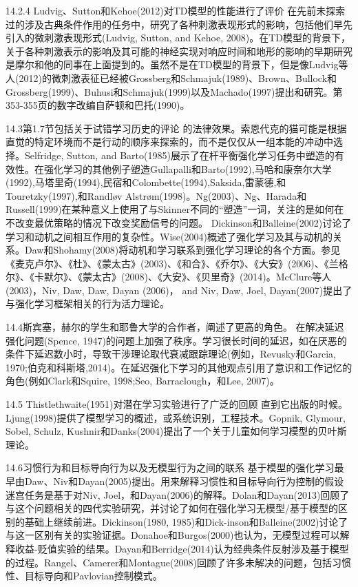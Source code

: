 14.2.4 Ludvig、Sutton和Kehoe(2012)对TD模型的性能进行了评价
在先前未探索过的涉及古典条件作用的任务中，研究了各种刺激表现形式的影响，包括他们早先引入的微刺激表现形式(Ludvig, Sutton, and Kehoe, 2008)。在TD模型的背景下，关于各种刺激表示的影响及其可能的神经实现对响应时间和地形的影响的早期研究是摩尔和他的同事在上面提到的。虽然不是在TD模型的背景下，但是像Ludvig等人(2012)的微刺激表征已经被Grossberg和Schmajuk(1989)、Brown、Bullock和Grossberg(1999)、Buhusi和Schmajuk(1999)以及Machado(1997)提出和研究。第353-355页的数字改编自萨顿和巴托(1990)。

14.3第1.7节包括关于试错学习历史的评论
的法律效果。索恩代克的猫可能是根据直觉的特定环境而不是行动的顺序来探索的，而不是仅仅从一组本能的冲动中选择。Selfridge, Sutton, and Barto(1985)展示了在杆平衡强化学习任务中塑造的有效性。在强化学习的其他例子塑造Gullapalli和Barto(1992),马哈和康奈尔大学(1992),马塔里奇(1994),民宿和Colombette(1994),Saksida,雷蒙德,和Touretzky(1997),和Randløv Alstrøm(1998)。Ng(2003)、Ng、Harada和Russell(1999)在某种意义上使用了与Skinner不同的“塑造”一词，关注的是如何在不改变最优策略的情况下改变奖励信号的问题。
Dickinson和Balleine(2002)讨论了学习和动机之间相互作用的复杂性。Wise(2004)概述了强化学习及其与动机的关系。Daw和Shohamy(2008)将动机和学习联系到强化学习理论的各个方面。参见《麦克卢尔》、《杜》、《蒙太古》(2003)、《和合》、《乔尔》、《大安》(2006)、《兰格尔》、《卡默尔》、《蒙太古》(2008)、《大安》、《贝里奇》(2014)。McClure等人(2003)，Niv, Daw, Daw, Dayan (2006)， and Niv, Daw, Joel, Dayan(2007)提出了与强化学习框架相关的行为活力理论。

14.4斯宾塞，赫尔的学生和耶鲁大学的合作者，阐述了更高的角色。
在解决延迟强化问题(Spence, 1947)的问题上加强了秩序。学习很长时间的延迟，如在厌恶的条件下延迟数小时，导致干涉理论取代衰减跟踪理论(例如，Revusky和Garcia, 1970;伯克和科斯塔,2014)。在延迟强化下学习的其他观点引用了意识和工作记忆的角色(例如Clark和Squire, 1998;Seo, Barraclough，和Lee, 2007)。

14.5 Thistlethwaite(1951)对潜在学习实验进行了广泛的回顾
直到它出版的时候。Ljung(1998)提供了模型学习的概述，或系统识别，工程技术。Gopnik, Glymour, Sobel, Schulz, Kushnir和Danks(2004)提出了一个关于儿童如何学习模型的贝叶斯理论。

14.6习惯行为和目标导向行为以及无模型行为之间的联系
基于模型的强化学习最早由Daw、Niv和Dayan(2005)提出。用来解释习惯性和目标导向行为控制的假设迷宫任务是基于对Niv, Joel，和Dayan(2006)的解释。Dolan和Dayan(2013)回顾了与这个问题相关的四代实验研究，并讨论了如何在强化学习无模型/基于模型的区别的基础上继续前进。Dickinson(1980, 1985)和Dick-inson和Balleine(2002)讨论了与这一区别有关的实验证据。Donahoe和Burgos(2000)也认为，无模型过程可以解释收益-贬值实验的结果。Dayan和Berridge(2014)认为经典条件反射涉及基于模型的过程。Rangel、Camerer和Montague(2008)回顾了许多未解决的问题，包括习惯性、目标导向和Pavlovian控制模式。

